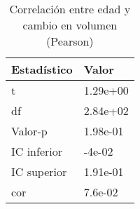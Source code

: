 \begin{table}[ht]
\centering
\caption{Correlación entre edad y cambio en volumen (Pearson)} 
\label{tab:correlacion_volumen}
\begin{tabular}{ll}
  \hline
Estadístico & Valor \\ 
  \hline
t & 1.29e+00 \\ 
  df & 2.84e+02 \\ 
  Valor-p & 1.98e-01 \\ 
  IC inferior & -4e-02 \\ 
  IC superior & 1.91e-01 \\ 
  cor & 7.6e-02 \\ 
   \hline
\end{tabular}
\end{table}
